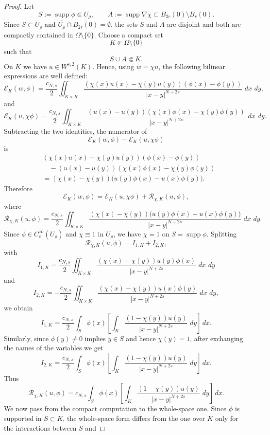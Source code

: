 \documentclass[11pt,a4paper]{article}
\newcommand{\dd}{\,d}
\newcommand{\supp}{\operatorname{supp}}
\begin{document}
\begin{proof}
Let
\[
S:=\supp\phi\Subset U_\rho,
\qquad
A:=\supp\nabla\chi\subset B_{2r}(0)\setminus B_r(0).
\]
Since \(S\subset U_\rho\) and \(\overline{U_\rho}\cap \overline{B_{2r}(0)}=\emptyset\), the sets
\(S\) and \(A\) are disjoint and both are compactly contained in
\(\Omega\setminus\{0\}\). Choose a compact set
\[
K\Subset\Omega\setminus\{0\}
\]
such that
\[
S\cup A\Subset K.
\]
On \(K\) we have \(u\in W^{s,2}(K)\). Hence, using \(w=\chi u\), the following bilinear expressions are well defined:
\[
\mathcal E_K(w,\phi)
=
\frac{c_{N,s}}2
\iint_{K\times K}
\frac{
(\chi(x)u(x)-\chi(y)u(y))(\phi(x)-\phi(y))
}
{|x-y|^{N+2s}}\,\dd x\,\dd y,
\]
and
\[
\mathcal E_K(u,\chi\phi)
=
\frac{c_{N,s}}2
\iint_{K\times K}
\frac{
(u(x)-u(y))(\chi(x)\phi(x)-\chi(y)\phi(y))
}
{|x-y|^{N+2s}}\,\dd x\,\dd y.
\]
Subtracting the two identities, the numerator of
\[
\mathcal E_K(w,\phi)-\mathcal E_K(u,\chi\phi)
\]
is
\[
\begin{aligned}
&(\chi(x)u(x)-\chi(y)u(y))(\phi(x)-\phi(y))\\
&\quad
-(u(x)-u(y))(\chi(x)\phi(x)-\chi(y)\phi(y))\\
&=
(\chi(x)-\chi(y))
\bigl(u(y)\phi(x)-u(x)\phi(y)\bigr).
\end{aligned}
\]
Therefore
\[
\mathcal E_K(w,\phi)
=
\mathcal E_K(u,\chi\phi)+\mathcal R_{\chi,K}(u,\phi),
\]
where
\[
\mathcal R_{\chi,K}(u,\phi)
=
\frac{c_{N,s}}2
\iint_{K\times K}
\frac{
(\chi(x)-\chi(y))
\bigl(u(y)\phi(x)-u(x)\phi(y)\bigr)
}
{|x-y|^{N+2s}}
\,\dd x\,\dd y.
\]
Since \(\phi\in C_c^\infty(U_\rho)\) and \(\chi\equiv1\) in \(U_\rho\), we
have \(\chi=1\) on \(S=\supp\phi\). Splitting
\[
\mathcal R_{\chi,K}(u,\phi)=I_{1,K}+I_{2,K},
\]
with
\[
I_{1,K}
=
\frac{c_{N,s}}2
\iint_{K\times K}
\frac{(\chi(x)-\chi(y))u(y)\phi(x)}
{|x-y|^{N+2s}}\,\dd x\,\dd y
\]
and
\[
I_{2,K}
=
-\frac{c_{N,s}}2
\iint_{K\times K}
\frac{(\chi(x)-\chi(y))u(x)\phi(y)}
{|x-y|^{N+2s}}\,\dd x\,\dd y,
\]
we obtain
\[
I_{1,K}
=
\frac{c_{N,s}}2
\int_{S}
\phi(x)
\left[
\int_K
\frac{(1-\chi(y))u(y)}
{|x-y|^{N+2s}}\,\dd y
\right]\dd x.
\]
Similarly, since \(\phi(y)\neq0\) implies \(y\in S\) and hence
\(\chi(y)=1\), after exchanging the names of the variables we get
\[
I_{2,K}
=
\frac{c_{N,s}}2
\int_{S}
\phi(x)
\left[
\int_K
\frac{(1-\chi(y))u(y)}
{|x-y|^{N+2s}}\,\dd y
\right]\dd x.
\]
Thus
\[
\mathcal R_{\chi,K}(u,\phi)
=
c_{N,s}
\int_{S}
\phi(x)
\left[
\int_K
\frac{(1-\chi(y))u(y)}
{|x-y|^{N+2s}}\,\dd y
\right]\dd x.
\]
We now pass from the compact computation to the whole-space one. Since
\(\phi\) is supported in \(S\subset K\), the whole-space form differs from the one over \(K\) only for the interactions between \(S\) and

\end{proof}
\end{document}

